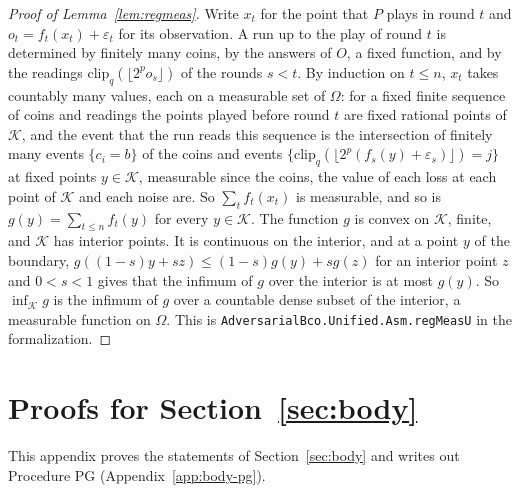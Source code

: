 \documentclass[11pt]{amsart}
\theoremstyle{definition}
\numberwithin{equation}{section}
\newcommand{\cK}{\mathcal{K}}
\begin{document}
\begin{proof}[Proof of Lemma~\ref{lem:regmeas}]
Write $x_t$ for the point that $P$ plays in round $t$ and $o_t=f_t(x_t)+\varepsilon_t$ for its observation. A run up to the play of round $t$ is determined by finitely many coins, by the answers of $O$, a fixed function, and by the readings $\mathrm{clip}_q(\lfloor2^po_s\rfloor)$ of the rounds $s<t$. By induction on $t\le n$, $x_t$ takes countably many values, each on a measurable set of $\Omega$: for a fixed finite sequence of coins and readings the points played before round $t$ are fixed rational points of $\cK$, and the event that the run reads this sequence is the intersection of finitely many events $\{c_i=b\}$ of the coins and events $\{\mathrm{clip}_q(\lfloor2^p(f_s(y)+\varepsilon_s)\rfloor)=j\}$ at fixed points $y\in\cK$, measurable since the coins, the value of each loss at each point of $\cK$ and each noise are. So $\sum_tf_t(x_t)$ is measurable, and so is $g(y)=\sum_{t\le n}f_t(y)$ for every $y\in\cK$. The function $g$ is convex on $\cK$, finite, and $\cK$ has interior points. It is continuous on the interior, and at a point $y$ of the boundary, $g((1-s)y+sz)\le(1-s)g(y)+sg(z)$ for an interior point $z$ and $0<s<1$ gives that the infimum of $g$ over the interior is at most $g(y)$. So $\inf_\cK g$ is the infimum of $g$ over a countable dense subset of the interior, a measurable function on $\Omega$.
This is \texttt{AdversarialBco.Unified.Asm.regMeasU} in the formalization.
\end{proof}

\section{Proofs for Section~\ref{sec:body}}\label{app:body}

This appendix proves the statements of Section~\ref{sec:body} and writes out Procedure PG (Appendix~\ref{app:body-pg}).
\end{document}
